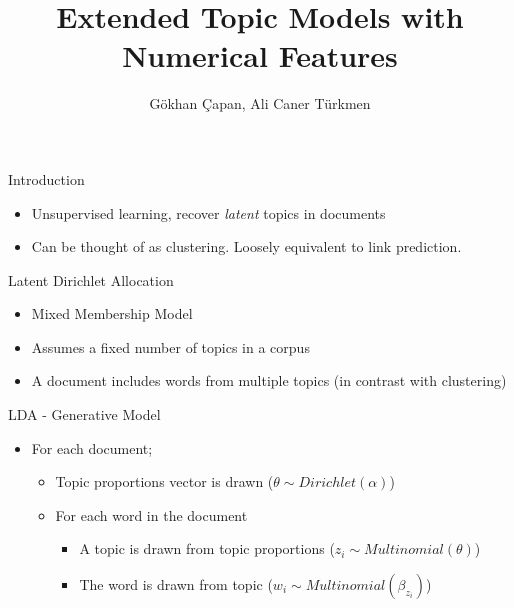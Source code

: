 \documentclass[pdf]{beamer}
\title{Extended Topic Models with Numerical Features}
\author{G\" okhan \c Capan, Ali Caner T\" urkmen}
\begin{document}
	
\begin{frame}
	\titlepage
\end{frame}

\begin{frame}{Introduction}
	
	\begin{itemize}
		\item Unsupervised learning, recover \emph{latent} topics in documents
		\item Can be thought of as clustering. Loosely equivalent to link prediction.
	\end{itemize}
\end{frame}

\begin{frame}{Latent Dirichlet Allocation}	
	\begin{itemize}
		\item Mixed Membership Model
		\item Assumes a fixed number of topics in a corpus
		\item A document includes words from multiple topics (in contrast with clustering)
	\end{itemize}
\end{frame}

\begin{frame}{LDA - Generative Model}	
	\begin{itemize}
		\item For each document;
		\begin{itemize}
			\item Topic proportions vector is drawn ($\theta \sim Dirichlet(\alpha)$)
			\item For each word in the document
			\begin{itemize}
				\item A topic is drawn from topic proportions ($z_i \sim Multinomial(\theta)$)
				\item The word is drawn from topic ($w_i \sim Multinomial(\beta_{z_i})$)
			\end{itemize}
		\end{itemize}
	\end{itemize}
\end{frame}
\end{document}
